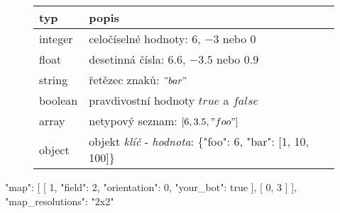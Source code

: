 \begin{figure}[H]
	\begin{minipage}{.6\textwidth}%
		\begin{tabular}{ T | p{6.5cm} }%
			typ & popis \\
			\hline
			integer & celočíselné hodnoty: $6$, $-3$ nebo $0$ \\
			float & desetinná čísla: $6.6$, $-3.5$ nebo $0.9$ \\
			string & řetězec znaků: $"bar"$ \\
			boolean & pravdivostní hodnoty $true$ a $false$ \\
			array & netypový seznam: $[6, 3.5, "foo"]$ \\
			object & objekt \textit{klíč} - \textit{hodnota}: \{"foo": 6, "bar": [1, 10, 100]\} \\
		\end{tabular}
	\end{minipage}%
	\hfill%
	\begin{minipage}{.3\textwidth}
	    \centering
	    
	\end{minipage}
\end{figure}

\begin{code}[language=json,caption={Ukázka datového formátu JSON}]
{"map": [
	[
		1,
		{
			"field": 2,
			"orientation": 0,
			"your_bot": true
		}
	],
	[
		0,
		3
	]
	], "map_resolutions": "2x2"
}
\end{code}